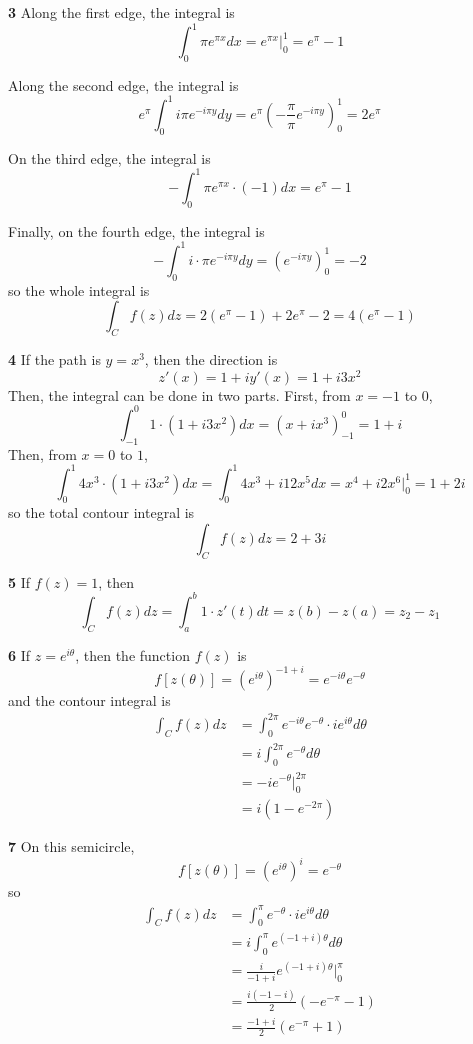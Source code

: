 \documentclass{article}
\begin{document}
\textbf{3}
Along the first edge, the integral is
\[
	\int_0^1 \pi e^{\pi x} dx 
	= e^{\pi x} \Big|_0^1
	= e^\pi - 1
\]

Along the second edge, the integral is
\[
	e^\pi \int_0^1 i \pi e^{-i \pi y} dy
	= e^\pi \left( -\frac{\pi}{\pi} e^{-i \pi y}\right)_0^1
	= 2e^\pi 
\]

On the third edge, the integral is
\[
	- \int_0^1 \pi e^{\pi x} \cdot (-1) dx 
	= e^\pi - 1
\]

Finally, on the fourth edge, the integral is
\[
	-\int_0^1 i \cdot \pi e^{-i \pi y} dy
	= \left( e^{-i\pi y} \right)_0^1
	= -2
\]
so the whole integral is
\[
	\int_C f(z) dz = 2(e^\pi - 1) + 2e^\pi - 2
	= 4(e^\pi - 1)
\]

\textbf{4}
If the path is $y = x^3$, then the direction is
\[
	z'(x) = 1 + iy'(x) = 1 + i3x^2
\]
Then, the integral can be done in two parts. First, from $x = -1$ to $0$,
\[
	\int_{-1}^0 1 \cdot (1 + i3x^2) dx 
	= \left(x + ix^3 \right)_{-1}^0
	= 1 + i
\]
Then, from $x = 0$ to $1$,
\[
	\int_0^1 4x^3 \cdot (1 + i3x^2) dx
	= \int_0^1 4x^3 + i12x^5 dx
	= x^4 + i2x^6 \Big|_0^1
	= 1 + 2i
\]
so the total contour integral is
\[
	\int_C f(z) dz = 2 + 3i
\]

\textbf{5}
If $f(z) = 1$, then
\[
	\int_C f(z) dz
	= \int_a^b 1 \cdot z'(t) dt
	= z(b) - z(a) 
	= z_2 - z_1
\]
	
\textbf{6}
If $z = e^{i\theta}$, then the function $f(z)$ is
\[
	f[z(\theta)] 
	= (e^{i\theta})^{-1 + i}
	= e^{-i\theta} e^{-\theta}
\]
and the contour integral is
\begin{align*}
	\int_C f(z) dz
	&= \int_0^{2\pi} e^{-i\theta} e^{-\theta} \cdot ie^{i\theta} d\theta \\
	&= i \int_0^{2\pi} e^{-\theta} d\theta \\
	&= -i e^{-\theta} \Big|_0^{2\pi} \\
	&= i (1 - e^{-2\pi})
\end{align*}


\textbf{7}
On this semicircle,
\[
	f[z(\theta)] = (e^{i\theta})^i = e^{-\theta}
\]
so
\begin{align*}
	\int_C f(z) dz
	&= \int_0^\pi e^{-\theta} \cdot ie^{i\theta} d\theta \\
	&= i \int_0^\pi e^{(-1 + i) \theta} d\theta \\
	&= \frac{i}{-1 + i} e^{(-1 + i) \theta} \Big|_0^\pi \\
	&= \frac{i(-1 - i)}{2} ( -e^{-\pi} - 1 ) \\
	&= \frac{-1 + i}{2}(e^{-\pi} + 1)
\end{align*}
\end{document}
